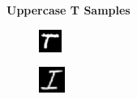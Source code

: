 \documentclass[conference]{IEEEtran}
\begin{document}
\begin{figure}[h]
\begin{subfigure}{.10\textwidth}
        \label{fig:issue_N04}
    \end{subfigure}\par\medskip
    \textbf{Uppercase T Samples}\par\medskip
    \begin{subfigure}{.10\textwidth}
        \centering
        \includegraphics[width=.90\textwidth]{./images/issues/T-0.png}
        \label{fig:issue_T0}
    \end{subfigure}%
    \begin{subfigure}{.10\textwidth}
        \centering
        \includegraphics[width=.90\textwidth]{./images/issues/T-01.png}

\end{subfigure}
\end{figure}
\end{document}
